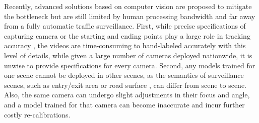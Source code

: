 Recently, advanced solutions based on computer vision
are proposed to mitigate the bottleneck
but are still limited by human processing bandwidth and far away from a fully automatic traffic surveillance.
First, while precise specifications of capturing camera or the starting and ending points play a large role in tracking accuracy \cite{yanziVehicleTracker,tamersoy2009robust,rodriguez2010adaptive,mishra2013video,cheng2011intelligent,corral2017slot}, 
the videos are time-consuming to hand-labeled accurately with this level of details,
while given a large number of cameras deployed nationwide, it is unwise to provide specifications for every camera.
%
Second,
any models trained for one scene cannot be deployed in other scenes,
as the semantics of surveillance scenes, such as entry/exit area \cite{tamersoy2009robust,rodriguez2010adaptive} or road surface \cite{bas2007automatic}, can differ from scene to scene. 
Also, the same camera can undergo slight adjustments in their focus and angle, and a model trained for that camera can become inaccurate and incur further costly re-calibrations.




